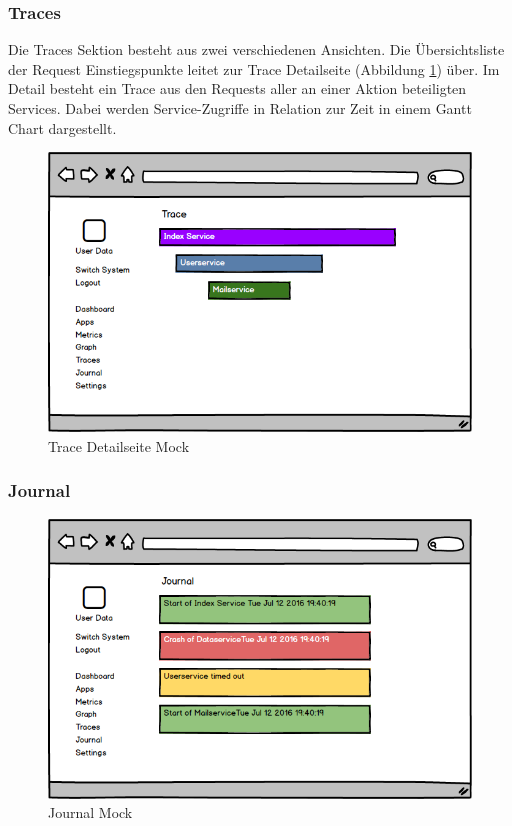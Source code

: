 \subsubsection{Traces}

Die Traces Sektion besteht aus zwei verschiedenen Ansichten. Die Übersichtsliste der Request Einstiegspunkte
leitet zur Trace Detailseite (Abbildung \ref{fig:trace}) über. Im Detail besteht ein Trace aus den Requests
aller an einer Aktion beteiligten Services. Dabei werden Service-Zugriffe in Relation zur Zeit in einem Gantt Chart dargestellt.

\vspace{0.3cm}
\begin{figure}[h]
 \centering
 \includegraphics[width=0.7\linewidth]{kapitel1/mocks/trace.png}
 \caption{Trace Detailseite Mock}
 \label{fig:trace}
\end{figure}


\subsubsection{Journal}

\begin{figure}[h]
 \centering
 \includegraphics[width=0.7\linewidth]{kapitel1/mocks/journal.png}
 \caption{Journal Mock}
 \label{fig:journalmock}
\end{figure}

